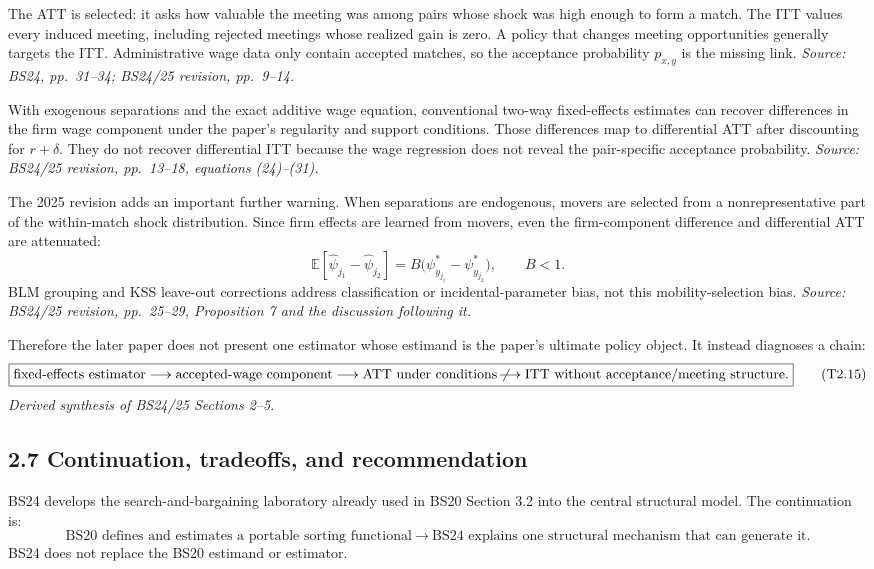 \documentclass[11pt]{article}
\begin{document}
The ATT is selected: it asks how valuable the meeting was among pairs whose
shock was high enough to form a match.  The ITT values every induced meeting,
including rejected meetings whose realized gain is zero.  A policy that changes
meeting opportunities generally targets the ITT.  Administrative wage data
only contain accepted matches, so the acceptance probability \(p_{x,y}\) is
the missing link.
\textit{Source: BS24, pp.\ 31--34; BS24/25 revision, pp.\ 9--14.}

With exogenous separations and the exact additive wage equation, conventional
two-way fixed-effects estimates can recover differences in the firm wage
component under the paper's regularity and support conditions.  Those
differences map to differential ATT after discounting for \(r+\delta\).  They
do not recover differential ITT because the wage regression does not reveal
the pair-specific acceptance probability.
\textit{Source: BS24/25 revision, pp.\ 13--18, equations (24)--(31).}

The 2025 revision adds an important further warning.  When separations are
endogenous, movers are selected from a nonrepresentative part of the
within-match shock distribution.  Since firm effects are learned from movers,
even the firm-component difference and differential ATT are attenuated:
\[
\mathbb E[\widehat\psi_{j_1}-\widehat\psi_{j_2}]
=
B\bigl(\psi^*_{y_{j_1}}-\psi^*_{y_{j_2}}\bigr),
\qquad B<1.
\tag{T2.14}
\]
BLM grouping and KSS leave-out corrections address classification or
incidental-parameter bias, not this mobility-selection bias.
\textit{Source: BS24/25 revision, pp.\ 25--29, Proposition 7 and the
discussion following it.}

Therefore the later paper does not present one estimator whose estimand is the
paper's ultimate policy object.  It instead diagnoses a chain:
\[
\boxed{
\text{fixed-effects estimator}
\longrightarrow
\text{accepted-wage component}
\longrightarrow
\text{ATT under conditions}
\not\!\longrightarrow
\text{ITT without acceptance/meeting structure}.
}
\tag{T2.15}
\]
\textit{Derived synthesis of BS24/25 Sections 2--5.}

\subsection{2.7 Continuation, tradeoffs, and recommendation}

BS24 develops the search-and-bargaining laboratory already used in BS20
Section 3.2 into the central structural model.  The continuation is:
\[
\boxed{
\text{BS20 defines and estimates a portable sorting functional}
\ \longrightarrow\
\text{BS24 explains one structural mechanism that can generate it.}}
\tag{T2.16}
\]
BS24 does not replace the BS20 estimand or estimator.
\end{document}
